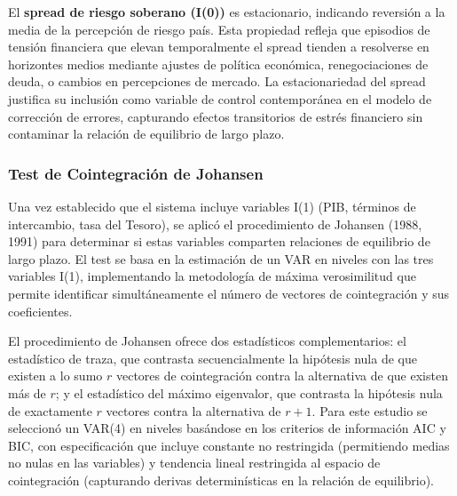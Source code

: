 \documentclass[3p,11pt,draft,natbib=false]{elsarticle}
\begin{document}
El \textbf{spread de riesgo soberano (I(0))} es estacionario, indicando reversión a la media de la percepción de riesgo país. Esta propiedad refleja que episodios de tensión financiera que elevan temporalmente el spread tienden a resolverse en horizontes medios mediante ajustes de política económica, renegociaciones de deuda, o cambios en percepciones de mercado. La estacionariedad del spread justifica su inclusión como variable de control contemporánea en el modelo de corrección de errores, capturando efectos transitorios de estrés financiero sin contaminar la relación de equilibrio de largo plazo.

\subsubsection{Test de Cointegración de Johansen}

Una vez establecido que el sistema incluye variables I(1) (PIB, términos de intercambio, tasa del Tesoro), se aplicó el procedimiento de Johansen (1988, 1991) para determinar si estas variables comparten relaciones de equilibrio de largo plazo. El test se basa en la estimación de un VAR en niveles con las tres variables I(1), implementando la metodología de máxima verosimilitud que permite identificar simultáneamente el número de vectores de cointegración y sus coeficientes.

El procedimiento de Johansen ofrece dos estadísticos complementarios: el estadístico de traza, que contrasta secuencialmente la hipótesis nula de que existen a lo sumo $r$ vectores de cointegración contra la alternativa de que existen más de $r$; y el estadístico del máximo eigenvalor, que contrasta la hipótesis nula de exactamente $r$ vectores contra la alternativa de $r+1$. Para este estudio se seleccionó un VAR(4) en niveles basándose en los criterios de información AIC y BIC, con especificación que incluye constante no restringida (permitiendo medias no nulas en las variables) y tendencia lineal restringida al espacio de cointegración (capturando derivas determinísticas en la relación de equilibrio).
\end{document}
